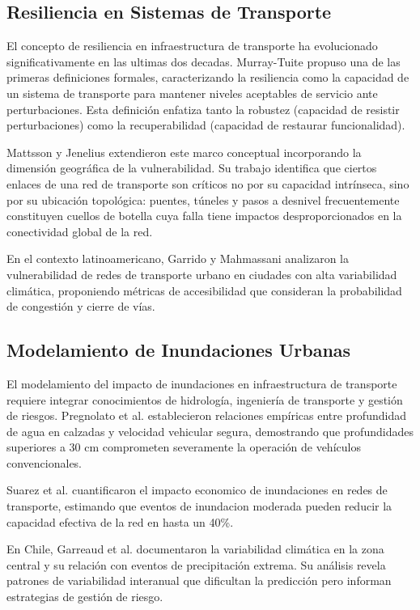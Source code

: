 \documentclass[conference]{IEEEtran}
\begin{document}
\subsection{Resiliencia en Sistemas de Transporte}

El concepto de resiliencia en infraestructura de transporte ha evolucionado significativamente en las ultimas dos decadas. Murray-Tuite \cite{murray2006} propuso una de las primeras definiciones formales, caracterizando la resiliencia como la capacidad de un sistema de transporte para mantener niveles aceptables de servicio ante perturbaciones. Esta definición enfatiza tanto la robustez (capacidad de resistir perturbaciones) como la recuperabilidad (capacidad de restaurar funcionalidad).

Mattsson y Jenelius \cite{mattsson2015} extendieron este marco conceptual incorporando la dimensión geográfica de la vulnerabilidad. Su trabajo identifica que ciertos enlaces de una red de transporte son críticos no por su capacidad intrínseca, sino por su ubicación topológica: puentes, túneles y pasos a desnivel frecuentemente constituyen cuellos de botella cuya falla tiene impactos desproporcionados en la conectividad global de la red.

En el contexto latinoamericano, Garrido y Mahmassani \cite{garrido2000} analizaron la vulnerabilidad de redes de transporte urbano en ciudades con alta variabilidad climática, proponiendo métricas de accesibilidad que consideran la probabilidad de congestión y cierre de vías.

\subsection{Modelamiento de Inundaciones Urbanas}

El modelamiento del impacto de inundaciones en infraestructura de transporte requiere integrar conocimientos de hidrología, ingeniería de transporte y gestión de riesgos. Pregnolato et al. \cite{pregnolato2017} establecieron relaciones empíricas entre profundidad de agua en calzadas y velocidad vehicular segura, demostrando que profundidades superiores a 30 cm comprometen severamente la operación de vehículos convencionales.

Suarez et al. \cite{suarez2005} cuantificaron el impacto economico de inundaciones en redes de transporte, estimando que eventos de inundacion moderada pueden reducir la capacidad efectiva de la red en hasta un 40\%.

En Chile, Garreaud et al. \cite{garreaud2017} documentaron la variabilidad climática en la zona central y su relación con eventos de precipitación extrema. Su análisis revela patrones de variabilidad interanual que dificultan la predicción pero informan estrategias de gestión de riesgo.
\end{document}
